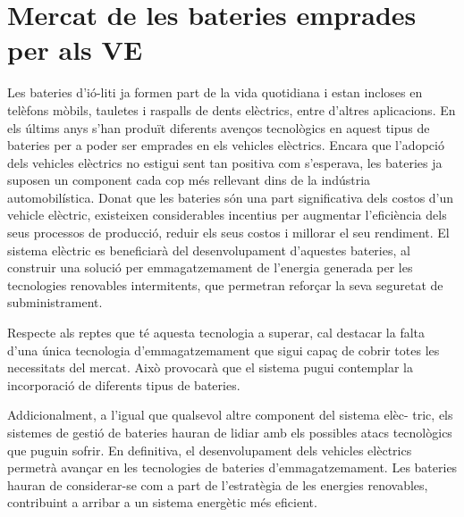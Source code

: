 
\section {Mercat de les bateries emprades per als VE}

Les bateries d'ió-liti ja formen part de la vida quotidiana i estan incloses en telèfons mòbils, tauletes i raspalls de dents elèctrics, entre d'altres aplicacions. En els últims anys s'han produït diferents avenços tecnològics en aquest tipus de bateries per a poder ser emprades en els vehicles elèctrics. Encara que l'adopció dels vehicles elèctrics no estigui sent tan positiva com s'esperava, les bateries ja suposen un component cada cop més rellevant dins de la indústria automobilística. Donat que les bateries són una part significativa dels costos d'un vehicle elèctric, existeixen considerables incentius per augmentar l'eficiència dels seus processos de producció, reduir els seus costos i millorar el seu rendiment. El sistema elèctric es beneficiarà del desenvolupament d'aquestes bateries, al construir una solució per emmagatzemament de l'energia generada per les tecnologies renovables intermitents, que permetran reforçar la seva seguretat de subministrament.

Respecte als reptes que té aquesta tecnologia a superar, cal destacar la falta d'una única tecnologia d'emmagatzemament que sigui capaç de cobrir totes les necessitats del mercat. Això provocarà que el sistema pugui contemplar la incorporació de diferents tipus de bateries. 

\newpage 

Addicionalment, a l'igual que qualsevol altre component del sistema elèc- \newline tric, els sistemes de gestió de bateries hauran de lidiar amb els possibles atacs tecnològics que puguin sofrir. En definitiva, el desenvolupament dels vehicles elèctrics permetrà avançar en les tecnologies de bateries \newline d'emmagatzemament. Les bateries hauran de considerar-se com a part de l'estratègia de les energies renovables, contribuint a arribar a un sistema energètic més eficient.

